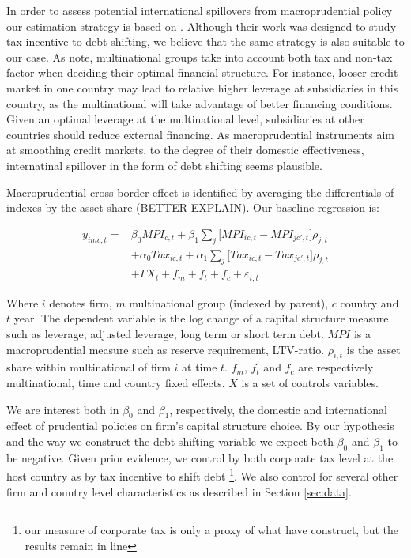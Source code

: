 \documentclass[12pt]{article}
\begin{document}
	
	In order to assess potential international spillovers from macroprudential policy our estimation strategy is based on \cite*{huizinga2008capital}. Although their work was designed to study tax incentive to debt shifting, we believe that the same strategy is also suitable to our case. As \cite{huizinga2008capital} note, multinational groups take into account both tax and non-tax factor when deciding their optimal financial structure. For instance, looser credit market in one country may lead to relative higher leverage at subsidiaries in this country, as the multinational will take advantage of better financing conditions. Given an optimal leverage at the multinational level, subsidiaries at other countries should reduce external financing. As macroprudential instruments aim at smoothing credit markets, to the degree of their domestic effectiveness, internatinal spillover in the form of debt shifting seems plausible.
	
	Macroprudential cross-border effect is identified by averaging the differentials of indexes by the asset share (BETTER EXPLAIN). Our baseline regression is:
	 
	\begin{equation*}
	\begin{aligned}
	y_{imc,t}=&\beta_0MPI_{c,t}+\beta_1\sum_j\bigg[MPI_{ic,t} - MPI_{jc',t}\bigg]\rho_{j,t}\\
	&+\alpha_0Tax_{ic,t}+\alpha_1\sum_j\bigg[Tax_{ic,t} - Tax_{jc',t}\bigg]\rho_{j,t}\\
	&+\Gamma X_{t}+f_{m}+f_{t}+f_{c}+\varepsilon_{i,t}
	\end{aligned}
	\end{equation*}
	
	Where $i$ denotes firm, $m$ multinational group (indexed by parent), $c$ country and $t$ year. The dependent variable is the log change of a capital structure measure such as leverage, adjusted leverage, long term or short term debt. $MPI$ is a macroprudential measure such as reserve requirement, LTV-ratio. $\rho_{i,t}$ is the asset share within multinational of firm $i$ at time $t$. $f_{m}$, $f_{t}$ and $f_{c}$ are respectively multinational, time and country fixed effects. $X$ is a set of controls variables.
	
	We are interest both in $\beta_0$ and $\beta_1$, respectively, the domestic and international effect of prudential policies on firm's capital structure choice. By our hypothesis and the way we construct the debt shifting variable we expect both $\beta_0$ and $\beta_1$ to be negative. Given prior evidence, we control by both corporate tax level at the host country as by tax incentive to shift debt \footnote{our measure of corporate tax is only a proxy of what \cite{huizinga2008capital} have construct, but the results remain in line}. We also control for several other firm and country level characteristics as described in Section \ref{sec:data}.
	
\end{document}

